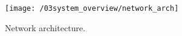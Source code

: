 \begin{figure}[ht]
	\centering
	\texttt{[image: /03system\_overview/network\_arch]}
	\caption{Network architecture.}
	\label{fig:network_arch}
\end{figure}
\clearpage





